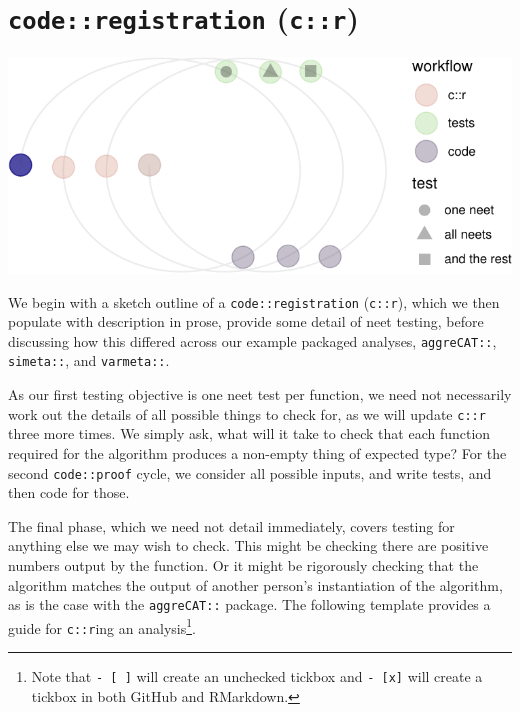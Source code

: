 \documentclass[
]{article}
\begin{document}
\hypertarget{coderegistration-cr}{%
\section{\texorpdfstring{\texttt{code::registration} (\texttt{c::r})}{code::registration (c::r)}}\label{coderegistration-cr}}

\begin{center}\includegraphics{when-is-done-done_files/figure-latex/unnamed-chunk-7-1} \end{center}

We begin with a sketch outline of a \texttt{code::registration} (\texttt{c::r}), which we then populate with description in prose, provide some detail of neet testing, before discussing how this differed across our example packaged analyses, \texttt{aggreCAT::}, \texttt{simeta::}, and \texttt{varmeta::}.

As our first testing objective is one neet test per function, we need not necessarily work out the details of all possible things to check for, as we will update \texttt{c::r} three more times. We simply ask, what will it take to check that each function required for the algorithm produces a non-empty thing of expected type? For the second \texttt{code::proof} cycle, we consider all possible inputs, and write tests, and then code for those.

The final phase, which we need not detail immediately, covers testing for anything else we may wish to check. This might be checking there are positive numbers output by the function. Or it might be rigorously checking that the algorithm matches the output of another person's instantiation of the algorithm, as is the case with the \texttt{aggreCAT::} package. The following template provides a guide for \texttt{c::r}ing an analysis\footnote{Note that \texttt{-\ {[}\ {]}} will create an unchecked tickbox and \texttt{-\ {[}x{]}} will create a tickbox in both GitHub and RMarkdown.}.
\end{document}
